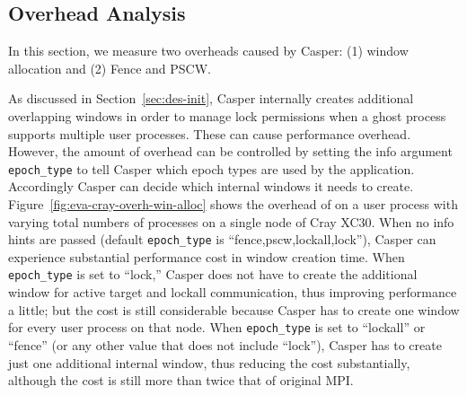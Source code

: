 

\subsection{Overhead Analysis}\label{sec:eva-overhead}

In this section, we measure two overheads caused by Casper: (1) window
allocation and (2) Fence and PSCW.

As discussed in Section~\ref{sec:des-init}, Casper internally creates
additional overlapping windows in order to manage lock permissions
when a ghost process supports multiple user processes.  These can cause
performance overhead.  However, the amount of overhead can be
controlled by setting the info argument \texttt{epoch\_type} to tell
Casper which epoch types are used by the application.  Accordingly
Casper can decide which internal windows it needs to create.
Figure~\ref{fig:eva-cray-overh-win-alloc} shows the overhead of
 on a user process with varying total numbers of
processes on a single node of Cray XC30. When no info hints
are passed (default \texttt{epoch\_type} is ``fence,pscw,lockall,lock''),
Casper can experience substantial performance cost in window creation time.
When \texttt{epoch\_type} is set to ``lock,'' Casper does not have to
create the additional window for active target and lockall
communication, thus improving performance a little; but the cost is
still considerable because Casper has to create one window for every user process
on that node.  When \texttt{epoch\_type} is set to ``lockall'' or
``fence'' (or any other value that does not include ``lock''), Casper
has to create just one additional internal window, thus reducing the
cost substantially, although the cost is still more than twice that of
original MPI.

